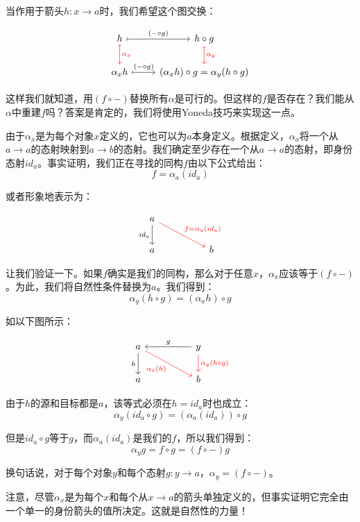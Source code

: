 \documentclass[DaoFP]{subfiles}
\begin{document}
 当作用于箭头$h \colon x \to a$时，我们希望这个图交换：

 \[
  \begin{tikzcd}
   h
   \arrow[r, mapsto, "(- \circ g)"]
   \arrow[d, mapsto, red, "\alpha_x"]
   & h \circ g
   \arrow[d, mapsto, red, "\alpha_y"]
   \\
   \alpha_x h
   \arrow[r, mapsto, "(- \circ g)"]
   &(\alpha_x h) \circ g = \alpha_y (h \circ g)
  \end{tikzcd}
 \]

 这样我们就知道，用$(f \circ -)$替换所有$\alpha$是可行的。但这样的$f$是否存在？我们能从$\alpha$中重建$f$吗？答案是肯定的，我们将使用Yoneda技巧来实现这一点。

 由于$\alpha_x$是为每个对象$x$定义的，它也可以为$a$本身定义。根据定义，$\alpha_a$将一个从$a \to a$的态射映射到$a \to b$的态射。我们确定至少存在一个从$a \to a$的态射，即身份态射$id_a$。事实证明，我们正在寻找的同构$f$由以下公式给出：
 \[f = \alpha_a (id_a)\]

 或者形象地表示为：

 \[
  \begin{tikzcd}
   a
   \arrow[d, "id_a"']
   \arrow[rrd, red, "f = \alpha_a (id_a)"]
   \\
   a
   && b
  \end{tikzcd}
 \]

 让我们验证一下。如果$f$确实是我们的同构，那么对于任意$x$，$\alpha_x$应该等于$(f \circ -)$。为此，我们将自然性条件替换为$a$。我们得到：
 \[\alpha_y(h \circ g) = (\alpha_a h) \circ g \]

 如以下图所示：

 \[
  \begin{tikzcd}
   a
   \arrow[d, "h"']
   \arrow[rrd,  red, "\alpha_a (h)"']
   && y
   \arrow[ll, "g"']
   \arrow[d, red, "\alpha_y (h \circ g)"]
   \\
   a
   && b
  \end{tikzcd}
 \]

 由于$h$的源和目标都是$a$，该等式必须在$h = id_a$时也成立：
 \[\alpha_y (id_a \circ g) = (\alpha_a (id_a)) \circ g \]

 但是$id_a \circ g$等于$g$，而$\alpha_a(id_a)$是我们的$f$，所以我们得到：
 \[\alpha_y g = f \circ g = (f \circ -) g\]

 换句话说，对于每个对象$y$和每个态射$g \colon y \to a$，$\alpha_y = (f \circ -)$。

 注意，尽管$\alpha_x$是为每个$x$和每个从$x \to a$的箭头单独定义的，但事实证明它完全由一个单一的身份箭头的值所决定。这就是自然性的力量！
\end{document}

